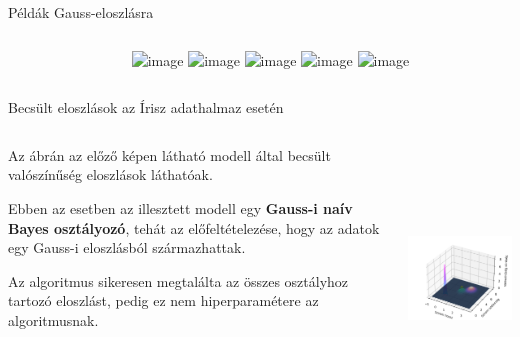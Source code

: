 \documentclass[english, aspectratio=169]{beamer}
\begin{document}
\begin{frame}{Példák Gauss-eloszlásra}
\begin{columns}
\begin{column}{.3\textwidth}
{\begin{block}{}
\[\]
\end{block}}
\end{column}
\begin{column}{.7\textwidth}
\begin{center}
\includegraphics<1>[width=10cm, height=7cm, keepaspectratio]{images/generative_5.png}
\includegraphics<2>[width=10cm, height=7cm, keepaspectratio]{images/generative_6.png}
\includegraphics<3>[width=10cm, height=7cm, keepaspectratio]{images/generative_7.png}
\includegraphics<4>[width=10cm, height=7cm, keepaspectratio]{images/generative_8.png}
\includegraphics<5>[width=10cm, height=7cm, keepaspectratio]{images/generative_9.png}
\end{center}
\end{column}
\end{columns}
\end{frame}

\begin{frame}{Becsült eloszlások az Írisz adathalmaz esetén}
\begin{columns}
\begin{column}{.5\textwidth}
Az ábrán az előző képen látható modell által becsült valószínűség eloszlások láthatóak.\par\smallskip
Ebben az esetben az illesztett modell egy \textbf{Gauss-i naív Bayes osztályozó}, tehát az előfeltételezése, hogy az adatok egy Gauss-i eloszlásból származhattak.\par\smallskip
Az algoritmus sikeresen megtalálta az összes osztályhoz tartozó eloszlást, pedig ez nem hiperparamétere az algoritmusnak.
\end{column}
\begin{column}{.5\textwidth}
\begin{center}
\includegraphics[width=7cm, height=7cm, keepaspectratio]{images/generative_4.png}
\end{center}
\end{column}
\end{columns}
\end{frame}
\end{document}
